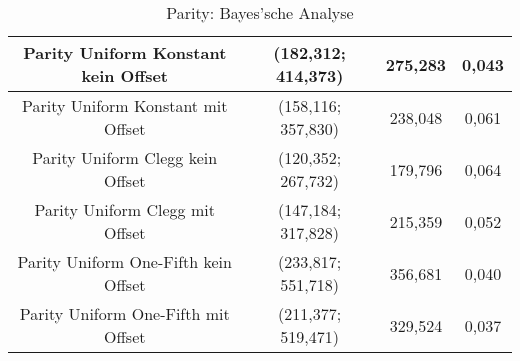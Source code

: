 \begin{table}[H]
\begin{tabular}{c | c | c | c}
		Parity Uniform Konstant kein Offset & (182,312; 414,373) & 275,283 & 0,043\\
		\hline
		Parity Uniform Konstant mit Offset & (158,116; 357,830) & 238,048 & 0,061\\
		\hline
		Parity Uniform Clegg kein Offset & (120,352; 267,732) & 179,796 & 0,064\\
		\hline
		Parity Uniform Clegg mit Offset & (147,184; 317,828) & 215,359 & 0,052\\
		\hline
		Parity Uniform One-Fifth kein Offset & \color{red}(233,817; 551,718)\color{black} & 356,681 & \color{red}0,040\color{black}\\
		\hline
		Parity Uniform One-Fifth mit Offset & (211,377; 519,471) & 329,524 & \color{red}0,037\color{black}\\
	\end{tabular}
	\caption{Parity: Bayes'sche Analyse}
	\label{table:parityBayesian}
\end{table} 
